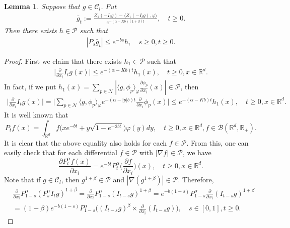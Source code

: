 \documentclass[12pt,a4paper]{amsart}
\theoremstyle{plain}
\newtheorem{lem}[thm]{Lemma}
\theoremstyle{definition}
\numberwithin{equation}{section}
\begin{document}
\begin{lem}\label{control of gn} Suppose that $g\in \mathcal{C}_l$.
    Put
\begin{align}
    \bar{g}_t
    :=\frac{Z_1(-I_tg)-\langle Z_1(-I_tg),\varphi\rangle}{e^{-(\alpha-Kb)(1+\beta)t}},\quad t\geq 0.
\end{align}
    Then there exists $h\in \mathcal{P}$ such that
\begin{align}
    |P_s\bar{g}_t|
    \leq e^{-bs}h,\quad s\geq 0, t\geq 0.
\end{align}
\end{lem}
\begin{proof}
    First we claim that there exists $h_1\in \mathcal P$ such that
\begin{align}
\label{ineq: control of partial derivative of Itg}
    \Big|\frac{\partial}{\partial x_i}I_tg(x)\Big| \leq e^{-(\alpha-Kb)t}h_1(x),
    \quad  t\geq 0, x\in \mathbb R^d.
\end{align}
    In fact, if we put $h_1(x)=\sum_{p\in \mathcal N}|\langle g, \phi_p\rangle_\varphi\frac{\partial \phi_p}{\partial x_i}(x)| \in \mathcal P$, then
\begin{align}
    \Big|\frac{\partial}{\partial x_i}I_tg(x)\Big| =
    \Big|\sum_{p\in \mathcal N}\langle g, \phi_p\rangle_\varphi e^{-(\alpha-|p|b)t} \frac{\partial}{\partial x_i}\phi_p(x)\Big|
     \leq e^{-(\alpha-Kb)t}h_1(x),
    \quad t\geq 0, x\in \mathbb R^d.
\end{align}
It is well known that
\[
    P_t f(x) = \int_{\mathbb R^d} f\big(x e^{-bt} + y \sqrt{1-e^{-2bt}}\big) \varphi(y) dy,
    \quad t\geq 0, x\in \mathbb R^d, f\in \mathcal B(\mathbb R^d, \mathbb R_+).
\]
    It is clear that the above equality also holds for each $f\in \mathcal P$.
From this, one can easily check that for each differential $f \in \mathcal P$ with $|\nabla  f| \in \mathcal P$, we have
\[
    \frac{\partial P_t^\alpha f(x)}{\partial x_i} = e^{-bt} P_t^\alpha\Big(\frac{\partial f}{\partial x_i}\Big)(x), \quad t\geq 0, x\in \mathbb R^d.
\]
    Note that if $g \in \mathcal C_l$, then $g^{1+\beta}\in \mathcal P$ and $|\nabla (g^{1+\beta})| \in \mathcal P$.
    Therefore,
\begin{align}
    &\frac{\partial}{\partial x_i} P_{1-s}^\alpha  (P_s^\alpha I_t g)^{1+\beta}
    = \frac{\partial}{\partial x_i} P_{1-s}^\alpha (I_{t-s} g)^{1+\beta}
    = e^{-b(1-s)} P_{1-s}^\alpha \frac{\partial}{\partial x_i} (I_{t-s}g)^{1+\beta}
    \\&=(1+\beta)e^{-b(1-s)} P_{1-s}^\alpha \Big( (I_{t-s}g)^\beta \times \frac{\partial}{\partial x_i} (I_{t-s}g) \Big),\quad s\in [0,1], t\geq 0.

\end{align}
\end{proof}
\end{document}
